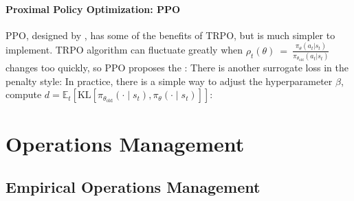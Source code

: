 \documentclass[10pt]{report}
\begin{document}
\subsubsection{Proximal Policy Optimization: PPO}
PPO, designed by \cite{schulman2017proximal}, has some of the benefits of TRPO, but is much simpler to implement. TRPO algorithm can fluctuate greatly when
$\rho_t(\theta)~=~\frac{\pi_\theta(a_t|s_t)}{\pi_{\theta_\mathrm{old}}(a_t|s_t)}$ changes too quickly, so PPO proposes the :
There is another surrogate loss in the penalty style:
In practice, there is a simple way to adjust the hyperparameter $\beta$, compute $d=\hat{\mathbb{E}}_t[\mathrm{KL}[\pi_{\theta_\mathrm{old}}(\cdot\mid s_t),\pi_\theta(\cdot\mid s_t)]]$:

\clearpage
\chapter{Operations Management}

\section{Empirical Operations Management}
\end{document}
